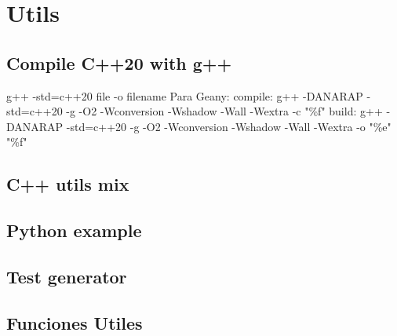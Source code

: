 \newpage
\section{Utils}

\subsection{Compile C++20 with g++}
\begin{code}
g++ -std=c++20 {file} -o {filename}
Para Geany:
compile: g++ -DANARAP -std=c++20 -g -O2 -Wconversion -Wshadow -Wall -Wextra -c "\%f"
build:   g++ -DANARAP -std=c++20 -g -O2 -Wconversion -Wshadow -Wall -Wextra -o "\%e" "\%f"
\end{code}

\subsection{C++ utils mix}


\newpage
\subsection{Python example}

\newpage
\subsection{Test generator}


\newpage
\subsection{Funciones Utiles}

%
%

%
